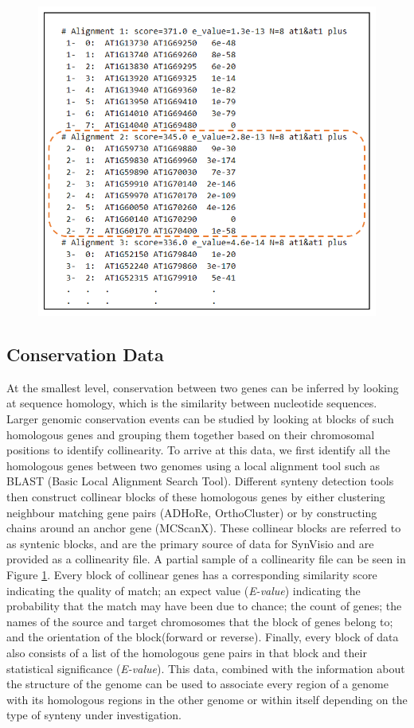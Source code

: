 \begin{figure}
  \centering
  \includegraphics[width=.675\linewidth]{images/ch_3_coll_file.PNG}
  \label{fig:ch_3_coll_file}
\end{figure}



\subsection{Conservation Data}
At the smallest level, conservation between two genes can be inferred by looking at sequence homology, which is the similarity between nucleotide sequences. Larger genomic conservation events can be studied by looking at blocks of such homologous genes and grouping them together based on their chromosomal positions to identify collinearity. To arrive at this data, we first identify all the homologous genes between two genomes using a local alignment tool such as BLAST (Basic Local Alignment Search Tool)\cite{blasttool}. Different synteny detection tools then construct collinear blocks of these homologous genes by either clustering neighbour matching gene pairs (ADHoRe, OrthoCluster) \cite{proost2011adhore,zeng2008orthocluster} or by constructing chains around an anchor gene (MCScanX)\cite{wang2012mcscanx}. These collinear blocks are referred to as syntenic blocks, and are the primary source of data for SynVisio and are provided as a collinearity file. A partial sample of a collinearity file can be seen in Figure \ref{fig:ch_3_coll_file}. Every block of collinear genes has a corresponding similarity score indicating the quality of match; an expect value (\textit{E-value}) indicating the probability that the match may have been due to chance; the count of genes; the names of the source and target chromosomes that the block of genes belong to; and the orientation of the block(forward or reverse). Finally, every block of data also consists of a list of the homologous gene pairs in that block and their statistical significance (\textit{E-value}). This data, combined with the information about the structure of the genome can be used to associate every region of a genome with its homologous regions in the other genome or within itself depending on the type of synteny under investigation.


